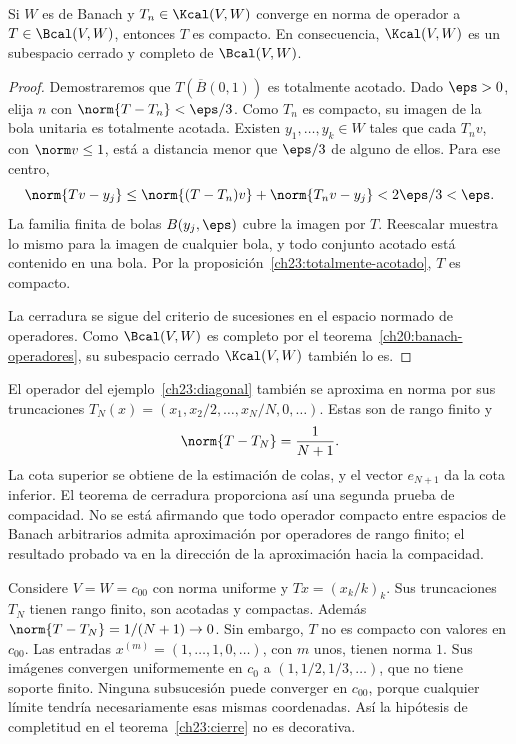 \begin{teorema}\label{ch23:cierre}
Si $W$ es de Banach y $T_n\in\Kcal(V,W)$ converge en norma de operador a $T\in\Bcal(V,W)$, entonces $T$ es compacto. En consecuencia, $\Kcal(V,W)$ es un subespacio cerrado y completo de $\Bcal(V,W)$.
\end{teorema}
\begin{proof}
Demostraremos que $T(\overline B(0,1))$ es totalmente acotado. Dado $\eps>0$, elija $n$ con $\norm{T-T_n}<\eps/3$. Como $T_n$ es compacto, su imagen de la bola unitaria es totalmente acotada. Existen $y_1,\ldots,y_k\in W$ tales que cada $T_nv$, con $\norm v\leq1$, está a distancia menor que $\eps/3$ de alguno de ellos. Para ese centro,
\[
 \norm{Tv-y_j}\leq\norm{(T-T_n)v}+\norm{T_nv-y_j}<2\eps/3<\eps.
\]
La familia finita de bolas $B(y_j,\eps)$ cubre la imagen por $T$. Reescalar muestra lo mismo para la imagen de cualquier bola, y todo conjunto acotado está contenido en una bola. Por la proposición~\ref{ch23:totalmente-acotado}, $T$ es compacto.

La cerradura se sigue del criterio de sucesiones en el espacio normado de operadores. Como $\Bcal(V,W)$ es completo por el teorema~\ref{ch20:banach-operadores}, su subespacio cerrado $\Kcal(V,W)$ también lo es.
\end{proof}

\begin{observacion}
El operador del ejemplo~\ref{ch23:diagonal} también se aproxima en norma por sus truncaciones $T_N(x)=(x_1,x_2/2,\ldots,x_N/N,0,\ldots)$. Estas son de rango finito y
\[
 \norm{T-T_N}=\frac1{N+1}.
\]
La cota superior se obtiene de la estimación de colas, y el vector $e_{N+1}$ da la cota inferior. El teorema de cerradura proporciona así una segunda prueba de compacidad. No se está afirmando que todo operador compacto entre espacios de Banach arbitrarios admita aproximación por operadores de rango finito; el resultado probado va en la dirección de la aproximación hacia la compacidad.
\end{observacion}

\begin{ejemplo}
Considere $V=W=c_{00}$ con norma uniforme y $Tx=(x_k/k)_k$. Sus truncaciones $T_N$ tienen rango finito, son acotadas y compactas. Además $\norm{T-T_N}=1/(N+1)\to0$. Sin embargo, $T$ no es compacto con valores en $c_{00}$. Las entradas $x^{(m)}=(1,\ldots,1,0,\ldots)$, con $m$ unos, tienen norma $1$. Sus imágenes convergen uniformemente en $c_0$ a $(1,1/2,1/3,\ldots)$, que no tiene soporte finito. Ninguna subsucesión puede converger en $c_{00}$, porque cualquier límite tendría necesariamente esas mismas coordenadas. Así la hipótesis de completitud en el teorema~\ref{ch23:cierre} no es decorativa.
\end{ejemplo}

